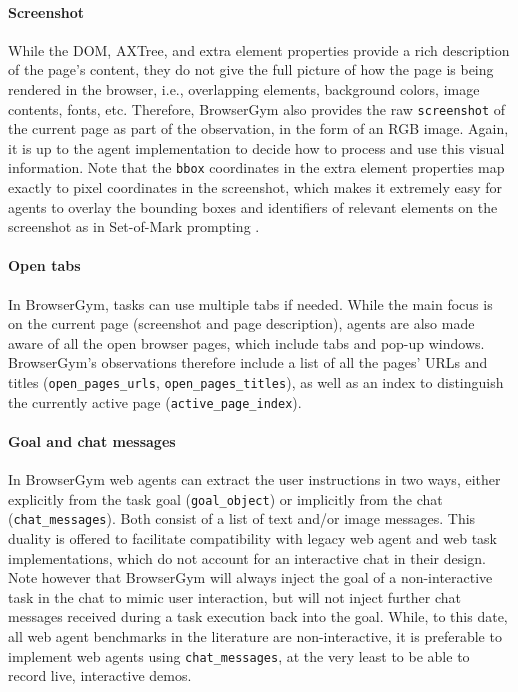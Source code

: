 \documentclass[10pt]{article} %
\begin{document}
\paragraph{Screenshot} While the DOM, AXTree, and extra element properties provide a rich description of the page's content, they do not give the full picture of how the page is being rendered in the browser, i.e., overlapping elements, background colors, image contents, fonts, etc. Therefore, BrowserGym also provides the raw \texttt{screenshot} of the current page as part of the observation, in the form of an RGB image. Again, it is up to the agent implementation to decide how to process and use this visual information. Note that the \texttt{bbox} coordinates in the extra element properties map exactly to pixel coordinates in the screenshot, which makes it extremely easy for agents to overlay the bounding boxes and identifiers of relevant elements on the screenshot as in Set-of-Mark prompting \citep{yang2023som,web-voyager}.

\paragraph{Open tabs} In BrowserGym, tasks can use multiple tabs if needed. While the main focus is on the current page (screenshot and page description), agents are also made aware of all the open browser pages, which include tabs and pop-up windows. BrowserGym's observations therefore include a list of all the pages' URLs and titles (\texttt{open\_pages\_urls}, \texttt{open\_pages\_titles}), as well as an index to distinguish the currently active page (\texttt{active\_page\_index}).

\paragraph{Goal and chat messages} In BrowserGym web agents can extract the user instructions in two ways, either explicitly from the task goal (\texttt{goal\_object}) or implicitly from the chat (\texttt{chat\_messages}). Both consist of a list of text and/or image messages. This duality is offered to facilitate compatibility with legacy web agent and web task implementations, which do not account for an interactive chat in their design. Note however that BrowserGym will always inject the goal of a non-interactive task in the chat to mimic user interaction, but will not inject further chat messages received during a task execution back into the goal. While, to this date, all web agent benchmarks in the literature are non-interactive, it is preferable to implement web agents using \texttt{chat\_messages}, at the very least to be able to record live, interactive demos.
\end{document}
